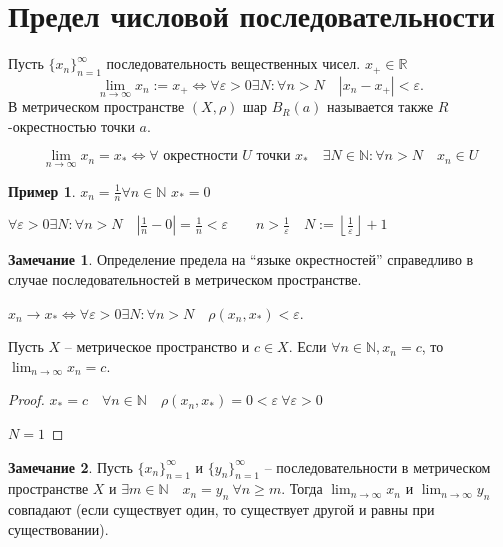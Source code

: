 \documentclass{book}
\newcommand\N{\ensuremath{\mathbb{N}}}
\newcommand\R{\ensuremath{\mathbb{R}}}
\theoremstyle{definition}
\newtheorem*{note}{Замечание}
\newtheorem*{example}{Пример}
\begin{document}
    \section{Предел числовой последовательности}
    \begin{definition}
        Пусть $\{x_n\}_{n=1}^{\infty}$ последовательность вещественных чисел. $x_{+}\in \R$
        \[
            \lim_{n \to \infty} x_n := x_+ \iff  \forall \varepsilon>0\exists N: \forall n>N \quad \left| x_n-x_+ \right| <\varepsilon.
        \]
        В метрическом пространстве $(X,\rho)$ шар $B_R(a)$ называется также $R$-окрестностью точки $a$.
    \end{definition}

    \begin{definition}
        $$\lim_{n \to \infty} x_n = x_* \iff \forall \text{ окрестности $U$ точки } x_*\quad \exists N\in \N : \forall n>N\quad x_{n} \in U$$
    \end{definition}
    \begin{example}
            $x_n = \frac{1}{n} \forall n\in \N $
            $x_* = 0$

            $\forall \varepsilon > 0 \exists N: \forall n>N\quad \left| \frac{1}{n} - 0 \right|  = \frac{1}{n}<\varepsilon\qquad n>\frac{1}{\varepsilon}\quad N:= \left\lfloor \frac{1}{\varepsilon} \right\rfloor +1$
    \end{example}
    \begin{note}
        Определение предела на ``языке окрестностей'' справедливо в случае последовательностей в метрическом пространстве.

        $x_n \to x_* \iff  \forall \varepsilon >0 \exists N: \forall n>N\quad \rho(x_n, x_*)<\varepsilon$.
    \end{note}
    \begin{statement}
        Пусть $X$ -- метрическое пространство и $c\in X$. 
        Если $\forall n\in \N , x_n = c$, то  $\lim_{n \to \infty } x_n = c$.
    \end{statement}
    \begin{proof}
        $x_* = c\quad \forall n\in \N \quad \rho(x_n, x_*) = 0<\varepsilon\  \forall \varepsilon > 0$

        $N=1$
    \end{proof}
    \begin{note}
        Пусть $\{x_n\}_{n=1}^{\infty }$ и $\{y_n\}_{n=1}^{\infty }$ -- последовательности в метрическом пространстве $X$ и $\exists m\in \N \quad x_n = y_n\ \forall n\geqslant m$. 
        Тогда $\lim_{n \to \infty} x_n$ и $\lim_{n \to \infty} y_n$ совпадают (если существует один, то существует другой и равны при существовании).
    \end{note}
\end{document}
